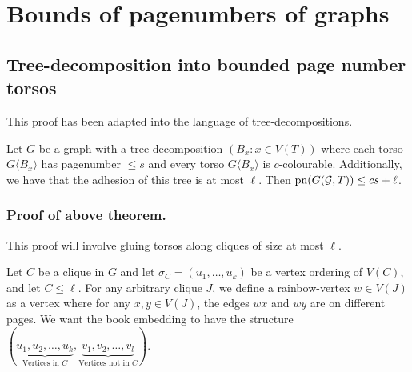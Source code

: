 \section{Bounds of pagenumbers of graphs}\label{sec:BoundedPagenumber} 
\subsection{Tree-decomposition into bounded page number torsos}\label{ssec:Clique_sum_Pagenumber_bound}

This proof has been adapted into the language of tree-decompositions. 
\begin{theorem}\label{thm:clique_sum_pagenumber_bound}
	Let \(G\) be a graph with a tree-decomposition \((B_x: x \in V(T))\) where each torso \(G \langle B_x \rangle\) has pagenumber \(\leq s\) and every torso \(G \langle B_x \rangle\) is \(c\)-colourable. Additionally, we have that the adhesion of this tree is at most \(\ell\).
	Then \(\operatorname{pn}(G(\mathcal{G}, T)) \leq cs + \ell \).  
\end{theorem}

\subsubsection{Proof of above theorem.}
This proof will involve gluing torsos along cliques of size at most \( \ell \). 

Let \(C\) be a clique in \(G\) and let \(\sigma_C = (u_1, \ldots , u_k)\) be a vertex ordering of \(V(C)\), and let \(C \leq \ell \). For any arbitrary clique \(J\), we define a rainbow-vertex \(w \in V(J)\) as a vertex where for any \(x, y \in V(J)\), the edges \(wx\) and \(wy\) are on different pages. We want the book embedding to have the structure \((\underbrace{u_1, u_2, \ldots, u_k}_{\text{Vertices in } C}, \underbrace{v_1, v_2, \ldots, v_l}_{\text{Vertices not in }C})\). 

